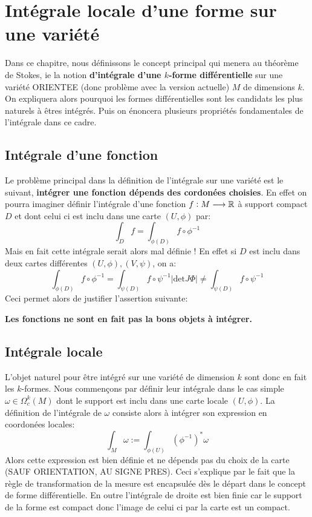 \chapter{Intégrale locale d'une forme sur une variété}
Dans ce chapitre, nous définissons le concept principal qui menera au théorème de Stokes, ie la notion \textbf{d'intégrale d'une \( k \)-forme différentielle} sur une variété ORIENTEE (donc problème avec la version actuelle) \( M \) de dimensions \( k \). On expliquera alors pourquoi les formes différentielles sont les candidats les plus naturels à êtres intégrés. Puis on énoncera plusieurs propriétés fondamentales de l'intégrale dans ce cadre.
\section{Intégrale d'une fonction}
Le problème principal dans la définition de l'intégrale sur une variété est le suivant, \textbf{intégrer une fonction dépends des cordonées choisies}. En effet on pourra imaginer définir l'intégrale d'une fonction \( f : M \longrightarrow \mathbb{R} \) à support compact \( D \) et dont celui ci est inclu dans une carte \((U, \phi)\) par:
\[ 
   \int_D f = \int_{\phi(D)} f  \circ \phi^{-1} 
\] 
Mais en fait cette intégrale serait alors mal définie ! En effet si \( D \) est inclu dans deux cartes différentes \( (U, \phi), (V, \psi) \), on a:
\[ 
   \int_{\phi(D)} f \circ \phi^{-1} = \int_{\psi(D)} f \circ \psi^{-1} \left|\text{det}J\Phi\right| \neq \int_{\psi(D)} f \circ \psi^{-1}
\]
Ceci permet alors de justifier l'assertion suivante:
\begin{center}
   \textbf{Les fonctions ne sont en fait pas la bons objets à intégrer.}   
\end{center}
\section{Intégrale locale}
L'objet naturel pour être intégré sur une variété de dimension \( k \) sont donc en fait les \( k \)-formes. Nous commençons par définir leur intégrale dans le cas simple \( \omega \in \Omega^k_c(M) \) dont le support est inclu dans une carte locale \( (U, \phi) \). La définition de l'intégrale de \( \omega \) consiste alors à intégrer son expression en coordonées locales:
\[ 
   \int_M \omega := \int_{ \phi(U)} (\phi^{-1})^*\omega 
\]
Alors cette expression est bien définie et ne dépends pas du choix de la carte (SAUF ORIENTATION, AU SIGNE PRES). Ceci s'explique par le fait que la règle de transformation de la mesure est encapsulée dès le départ dans le concept de forme différentielle. En outre l'intégrale de droite est bien finie car le support de la forme est compact donc l'image de celui ci par la carte est un compact.
\pagebreak
